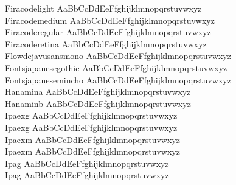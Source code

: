 \begin{tabbing}
Firacodelight \> { AaBbCcDdEeFfghijklmnopqrstuvwxyz} \\
Firacodemedium \> { AaBbCcDdEeFfghijklmnopqrstuvwxyz} \\
Firacoderegular \> { AaBbCcDdEeFfghijklmnopqrstuvwxyz} \\
Firacoderetina \> { AaBbCcDdEeFfghijklmnopqrstuvwxyz} \\
Flowdejavusansmono \> { AaBbCcDdEeFfghijklmnopqrstuvwxyz} \\
Fontsjapanesegothic \> { AaBbCcDdEeFfghijklmnopqrstuvwxyz} \\
Fontsjapanesemincho \> { AaBbCcDdEeFfghijklmnopqrstuvwxyz} \\
Hanamina \> { AaBbCcDdEeFfghijklmnopqrstuvwxyz} \\
Hanaminb \> { AaBbCcDdEeFfghijklmnopqrstuvwxyz} \\
Ipaexg \> { AaBbCcDdEeFfghijklmnopqrstuvwxyz} \\
Ipaexg \> { AaBbCcDdEeFfghijklmnopqrstuvwxyz} \\
Ipaexm \> { AaBbCcDdEeFfghijklmnopqrstuvwxyz} \\
Ipaexm \> { AaBbCcDdEeFfghijklmnopqrstuvwxyz} \\
Ipag \> { AaBbCcDdEeFfghijklmnopqrstuvwxyz} \\
Ipag \> { AaBbCcDdEeFfghijklmnopqrstuvwxyz} \\

\end{tabbing}
